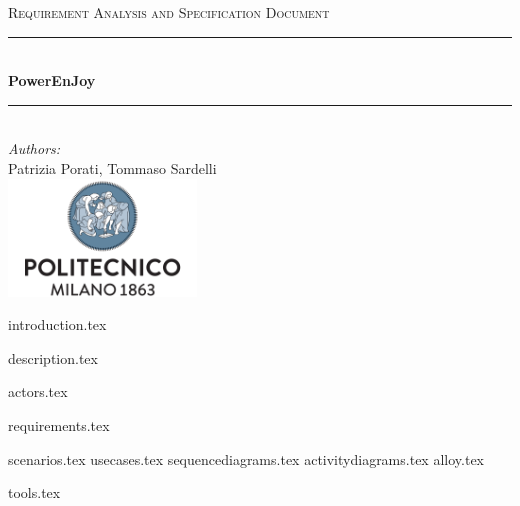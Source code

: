 \documentclass[a4paper,11pt]{article}
\begin{document}
\begin{titlepage}
\begin{center}
\textsc{\LARGE Requirement Analysis and Specification Document}\\[1.5cm] %

\rule{\linewidth}{0.5mm} \\[0.7cm]
{\huge \bfseries PowerEnJoy}\\[0.4cm] %
\rule{\linewidth}{0.5mm} \\[1.5cm]
 
\emph{Authors:}\\
Patrizia Porati, Tommaso Sardelli\\[2.0cm] 

\vfill
\vfill
\includegraphics[width=50mm]{polimi.png}\\
\end{center}
\end{titlepage}

\tableofcontents
\pagebreak

{introduction.tex}

{description.tex}

{actors.tex}

{requirements.tex}

{scenarios.tex}
{usecases.tex}
{sequencediagrams.tex}
{activitydiagrams.tex}
{alloy.tex}

{tools.tex}
\end{document}
